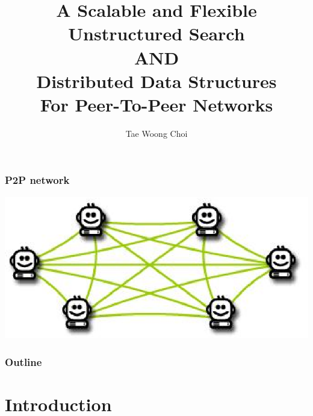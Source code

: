 \documentclass[red]{beamer}
\title{A Scalable and Flexible Unstructured Search \\
AND \\
Distributed Data Structures \\
For Peer-To-Peer Networks}
\author{Tae Woong Choi}
\institute[UF ECE]{University of Florida, Department of Electrical and Computer
Engineering}
\begin{document}
\frame{\titlepage}
\begin{frame}
\frametitle{P2P network}
\centering
\includegraphics[scale=1]{figs/p2p}

\end{frame}


\begin{frame}
\frametitle{Outline}
\tableofcontents[]
\end{frame}

\section{Introduction}
\end{document}
